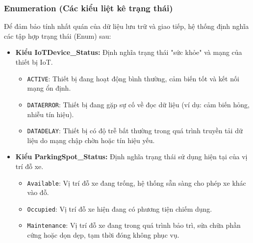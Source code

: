\subsubsection{Enumeration (Các kiểu liệt kê trạng thái)}
Để đảm bảo tính nhất quán của dữ liệu lưu trữ và giao tiếp, hệ thống định nghĩa các tập hợp trạng thái (Enum) sau:

\begin{itemize}
    \item \textbf{Kiểu IoTDevice\_Status:} Định nghĩa trạng thái "sức khỏe" và mạng của thiết bị IoT.
    \begin{itemize}
        \item \texttt{ACTIVE}: Thiết bị đang hoạt động bình thường, cảm biến tốt và kết nối mạng ổn định.
        \item \texttt{DATAERROR}: Thiết bị đang gặp sự cố về đọc dữ liệu (ví dụ: cảm biến hỏng, nhiễu tín hiệu).
        \item \texttt{DATADELAY}: Thiết bị có độ trễ bất thường trong quá trình truyền tải dữ liệu do mạng chập chờn hoặc tín hiệu yếu.
    \end{itemize}
    
    \item \textbf{Kiểu ParkingSpot\_Status:} Định nghĩa trạng thái sử dụng hiện tại của vị trí đỗ xe.
    \begin{itemize}
        \item \texttt{Available}: Vị trí đỗ xe đang trống, hệ thống sẵn sàng cho phép xe khác vào đỗ.
        \item \texttt{Occupied}: Vị trí đỗ xe hiện đang có phương tiện chiếm dụng.
        \item \texttt{Maintenance}: Vị trí đỗ xe đang trong quá trình bảo trì, sửa chữa phần cứng hoặc dọn dẹp, tạm thời đóng không phục vụ.
    \end{itemize}
\end{itemize}